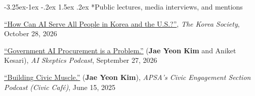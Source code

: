 \documentclass[10pt, letterpaper]{article}
\makeatletter
\renewcommand\subsection{\@startsection{subsection}{2}{\z@}%
  {-3.25ex\@plus -1ex \@minus -.2ex}%
  {1.5ex \@plus .2ex}%
  {\normalfont\large\bfseries\color{cvnavy}}}
\makeatother
\begin{document}
\subsection*{Public lectures, media interviews, and mentions}
\begin{etaremune}
    \item \href{https://www.youtube.com/watch?v=O0MUBtOdaxk&t=2s}{``How Can AI Serve All People in Korea and the U.S.?''}, \textit{The Korea Society}, October 28, 2026
    \item \href{https://youtu.be/9iozBEUdraY?si=MZIjk4o5bbJVQQCi}{``Government AI Procurement is a Problem.''} (\textbf{Jae Yeon Kim} and Aniket Kesari), \textit{AI Skeptics Podcast}, September 27, 2026
    \item \href{https://open.spotify.com/episode/5865Wjmn02pJavm1YH4yao?si=e9GJd_BFRg2Z5tOcPQzpPg}{``Building Civic Muscle.''} (\textbf{Jae Yeon Kim}), \textit{APSA's Civic Engagement Section Podcast (Civic Café)}, June 15, 2025

\end{etaremune}
\end{document}
